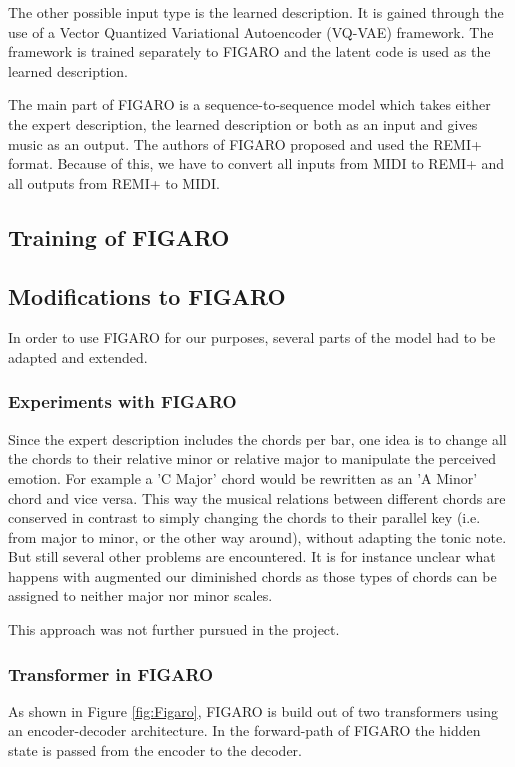 \documentclass{article}
\begin{document}
The other possible input type is the learned description. It is gained through the use of a Vector Quantized Variational Autoencoder (VQ-VAE) framework. The framework is trained separately to FIGARO and the latent code is used as the learned description. 

The main part of FIGARO is a sequence-to-sequence model which takes either the expert description, the learned description or both as an input and gives music as an output.
The authors of FIGARO proposed and used the REMI+ format. Because of this, we have to convert all inputs from MIDI to REMI+ and all outputs from REMI+ to MIDI. 

\subsection{Training of FIGARO}

\subsection{Modifications to FIGARO}
In order to use FIGARO for our purposes, several parts of the model had to be adapted and extended.

\subsubsection{Experiments with FIGARO}
Since the expert description includes the chords per bar, one idea is to change all the chords to their relative minor or relative major to manipulate the perceived emotion. For example a 'C Major' chord would be rewritten as an 'A Minor' chord and vice versa. This way the musical relations between different chords are conserved in contrast to simply changing the chords to their parallel key (i.e. from major to minor, or the other way around), without adapting the tonic note. But still several other problems are encountered. It is for instance unclear what happens with augmented our diminished chords as those types of chords can be assigned to neither major nor minor scales.

This approach was not further pursued in the project.

\subsubsection{Transformer in FIGARO}
As shown in Figure \ref{fig:Figaro}, FIGARO is build out of two transformers using an encoder-decoder architecture. In the forward-path of FIGARO the hidden state is passed from the encoder to the decoder.
\end{document}

